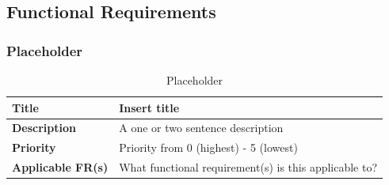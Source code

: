 \documentclass{article}
\begin{document}
\subsection{Functional Requirements}

\subsubsection{Placeholder}

\begin{table}[H]
	\caption{Placeholder}
	\begin{tabularx}{\textwidth}{|l|X|}
		\hline
		\textbf{Title}            & Insert title                                          \\ \hline
		\textbf{Description}      & A one or two sentence description                     \\ \hline
		\textbf{Priority}         & Priority from 0 (highest) - 5 (lowest)                \\ \hline
		\textbf{Applicable FR(s)} & What functional requirement(s) is this applicable to? \\ \hline
	\end{tabularx}
\end{table}
\end{document}
